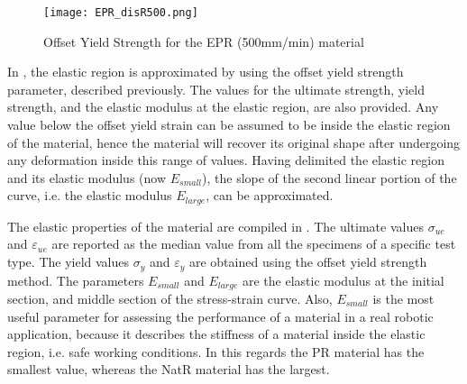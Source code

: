 \begin{figure}[H]
    \vspace*{-2em}
    \centering
    \texttt{[image: EPR\_disR500.png]}
    \caption{Offset Yield Strength for the EPR (500mm/min) material}
    \label{fig:EPR500off}
\end{figure}

In , the elastic region is approximated by using the offset yield strength parameter, described previously. The values for the ultimate strength, yield strength, and the elastic modulus at the elastic region, are also provided. Any value below the offset yield strain can be assumed to be inside the elastic region of the material, hence the material will recover its original shape after undergoing any deformation inside this range of values. Having delimited the elastic region and its elastic modulus (now $E_{small}$), the slope of the second linear portion of the curve, i.e. the elastic modulus $E_{large}$, can be approximated. 

The elastic properties of the material are compiled in . The ultimate values $\sigma_{ue}$ and $\varepsilon_{ue}$ are reported as the median value from all the specimens of a specific test type. The yield values $\sigma_{y}$ and $\varepsilon_{y}$ are obtained using the offset yield strength method. The parameters $E_{small}$ and $E_{large}$ are the elastic modulus at the initial section, and middle section of the stress-strain curve. Also, $E_{small}$ is the most useful parameter for assessing the performance of a material in a real robotic application, because it describes the stiffness of a material inside the elastic region, i.e. safe working conditions. In this regards the PR material has the smallest value, whereas the NatR material has the largest.


